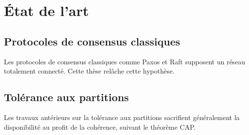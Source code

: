 \chapter{\'Etat de l'art}
\label{ch:etat-art}

\section{Protocoles de consensus classiques}

Les protocoles de consensus classiques comme Paxos
\citep{lamport1998part} et Raft \citep{ongaro2014search} supposent un
r\'eseau totalement connect\'e. Cette th\`ese rel\^ache cette
hypoth\`ese.

\section{Tol\'erance aux partitions}

Les travaux ant\'erieurs sur la tol\'erance aux partitions
sacrifient g\'en\'eralement la disponibilit\'e au profit de la
coh\'erence, suivant le th\'eor\`eme CAP.

